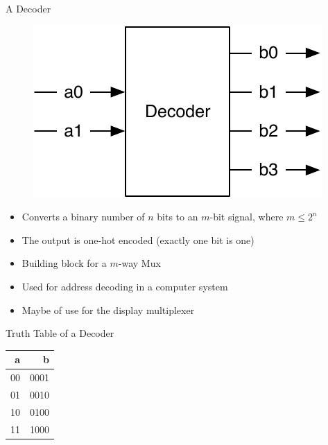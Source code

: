 \begin{frame}[fragile]{A Decoder}
\begin{figure}
  \includegraphics[scale=\scale]{../figures/decoder}
\end{figure}
\begin{itemize}
\item Converts a binary number of $n$ bits to an $m$-bit signal, where $m \leq 2^n$
\item The output is one-hot encoded (exactly one bit is one)
\item Building block for a $m$-way Mux
\item Used for address decoding in a computer system
\item Maybe of use for the display multiplexer
\end{itemize}
\end{frame}

\begin{frame}[fragile]{Truth Table of a Decoder}
\begin{table}
  \begin{tabular}{rr}
    \toprule
    a & b \\
    \midrule
    00 & 0001 \\
    01 & 0010 \\
    10 & 0100 \\
    11 & 1000 \\
    \bottomrule 
  \end{tabular} 
\end{table}
\end{frame}

